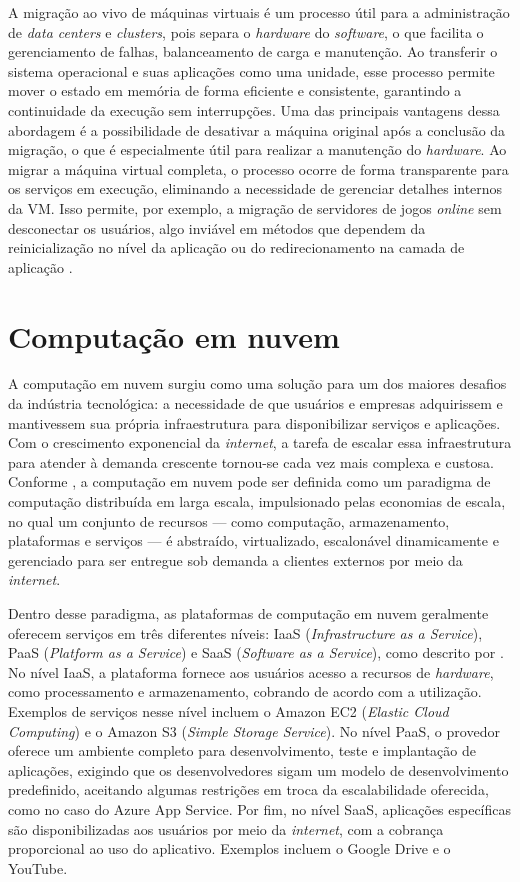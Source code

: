 \documentclass[
	12pt,				%
	oneside,			%
	a4paper,			%
	english,			%
	brazil				%
	]{abntex2ppgsi}
\begin{document}
A migração ao vivo de máquinas virtuais é um processo útil para a administração de \textit{data centers} e \textit{clusters}, pois separa o \textit{hardware} do \textit{software}, o que facilita o gerenciamento de falhas, balanceamento de carga e manutenção. Ao transferir o sistema operacional e suas aplicações como uma unidade, esse processo permite mover o estado em memória de forma eficiente e consistente, garantindo a continuidade da execução sem interrupções. Uma das principais vantagens dessa abordagem é a possibilidade de desativar a máquina original após a conclusão da migração, o que é especialmente útil para realizar a manutenção do \textit{hardware}. Ao migrar a máquina virtual completa, o processo ocorre de forma transparente para os serviços em execução, eliminando a necessidade de gerenciar detalhes internos da VM. Isso permite, por exemplo, a migração de servidores de jogos \textit{online} sem desconectar os usuários, algo inviável em métodos que dependem da reinicialização no nível da aplicação ou do redirecionamento na camada de aplicação \cite{10.5555/1251203.1251223}.

\section{Computação em nuvem}\label{section:computacao-nuvem}

A computação em nuvem surgiu como uma solução para um dos maiores desafios da indústria tecnológica: a necessidade de que usuários e empresas adquirissem e mantivessem sua própria infraestrutura para disponibilizar serviços e aplicações. Com o crescimento exponencial da \textit{internet}, a tarefa de escalar essa infraestrutura para atender à demanda crescente tornou-se cada vez mais complexa e custosa. Conforme , a computação em nuvem pode ser definida como um paradigma de computação distribuída em larga escala, impulsionado pelas economias de escala, no qual um conjunto de recursos --- como computação, armazenamento, plataformas e serviços --- é abstraído, virtualizado, escalonável dinamicamente e gerenciado para ser entregue sob demanda a clientes externos por meio da \textit{internet}.

Dentro desse paradigma, as plataformas de computação em nuvem geralmente oferecem serviços em três diferentes níveis: IaaS (\textit{Infrastructure as a Service}), PaaS (\textit{Platform as a Service}) e SaaS (\textit{Software as a Service}), como descrito por . No nível IaaS, a plataforma fornece aos usuários acesso a recursos de \textit{hardware}, como processamento e armazenamento, cobrando de acordo com a utilização. Exemplos de serviços nesse nível incluem o Amazon EC2 (\textit{Elastic Cloud Computing}) e o Amazon S3 (\textit{Simple Storage Service}). No nível PaaS, o provedor oferece um ambiente completo para desenvolvimento, teste e implantação de aplicações, exigindo que os desenvolvedores sigam um modelo de desenvolvimento predefinido, aceitando algumas restrições em troca da escalabilidade oferecida, como no caso do Azure App Service. Por fim, no nível SaaS, aplicações específicas são disponibilizadas aos usuários por meio da \textit{internet}, com a cobrança proporcional ao uso do aplicativo. Exemplos incluem o Google Drive e o YouTube.
\end{document}
